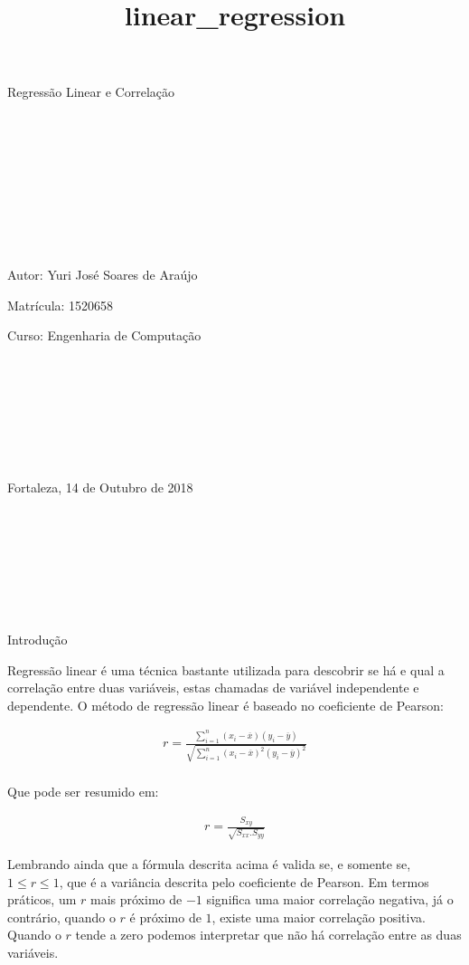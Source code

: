 \documentclass[11pt]{article}
\title{linear\_regression}
\begin{document}
    
    
    \maketitle
    
    

    
    Regressão Linear e Correlação

    ~

    ~

    ~

    ~

    ~

    Autor: Yuri José Soares de Araújo

    Matrícula: 1520658

    Curso: Engenharia de Computação

    ~

    ~

    ~

    ~

    Fortaleza, 14 de Outubro de 2018

    ~

    ~

    ~

    ~

    Introdução

    Regressão linear é uma técnica bastante utilizada para descobrir se há e
qual a correlação entre duas variáveis, estas chamadas de variável
independente e dependente. O método de regressão linear é baseado no
coeficiente de Pearson:

    \begin{align}
r = \frac{{}\sum_{i=1}^{n} (x_i - \overline{x})(y_i - \overline{y})}
{\sqrt{\sum_{i=1}^{n} (x_i - \overline{x})^2(y_i - \overline{y})^2}} \\
\end{align}

    Que pode ser resumido em:

    \begin{align}
r = \frac{{S_{xy}}}{{\sqrt{S_{xx}.S_{yy}}}}
\end{align}

    Lembrando ainda que a fórmula descrita acima é valida se, e somente se,
\({1 \leq r \leq 1}\), que é a variância descrita pelo coeficiente de
Pearson. Em termos práticos, um \({r}\) mais próximo de \({-1}\)
significa uma maior correlação negativa, já o contrário, quando o
\({r}\) é próximo de \({1}\), existe uma maior correlação positiva.
Quando o \({r}\) tende a zero podemos interpretar que não há correlação
entre as duas variáveis.
\end{document}
